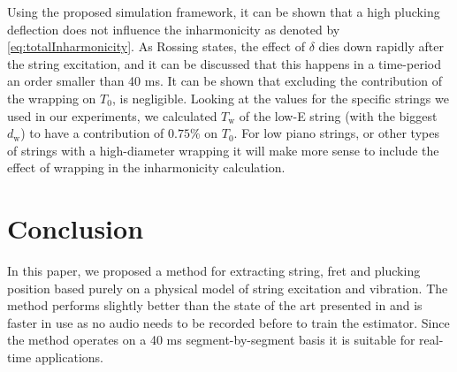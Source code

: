 \documentclass{article}
\begin{document}
\begin{sloppy}
Using the proposed simulation framework, it can be shown that a high plucking deflection does not influence the inharmonicity as denoted by \eqref{eq:totalInharmonicity}. As Rossing states, the effect of $\delta$ dies down rapidly after the string excitation, and it can be discussed that this happens in a time-period an order smaller than 40 ms. It can be shown that excluding the contribution of the wrapping on $T_0$, is negligible. Looking at the values for the specific strings we used in our experiments, we calculated $T_\text{w}$ of the low-E string (with the biggest $d_\text{w}$) to have a contribution of $0.75\%$ on $T_0$. For low piano strings, or other types of strings with a high-diameter wrapping it will make more sense to include the effect of wrapping in the inharmonicity calculation.
\vspace{-2pt}
\section{Conclusion}
In this paper, we proposed a method for extracting string, fret and plucking position based purely on a physical model of string excitation and vibration. The method performs slightly better than the state of the art presented in \cite{hjerrild::icassp19} and is faster in use as no audio needs to be recorded before to train the estimator. Since the method operates on a 40 ms segment-by-segment basis it is suitable for real-time applications.
%

\pagebreak


\end{sloppy}
\end{document}
